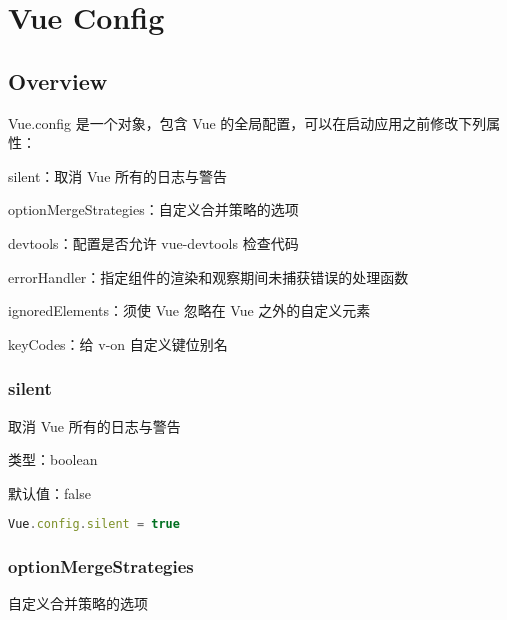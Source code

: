 \part{Vue Config}


\chapter{Overview}


Vue.config 是一个对象，包含 Vue 的全局配置，可以在启动应用之前修改下列属性：


\begin{compactitem}
\item silent：取消 Vue 所有的日志与警告
\item optionMergeStrategies：自定义合并策略的选项
\item devtools：配置是否允许 vue-devtools 检查代码
\item errorHandler：指定组件的渲染和观察期间未捕获错误的处理函数
\item ignoredElements：须使 Vue 忽略在 Vue 之外的自定义元素
\item keyCodes：给 v-on 自定义键位别名
\end{compactitem}


\section{silent}

取消 Vue 所有的日志与警告

\begin{compactitem}
\item 类型：boolean
\item 默认值：false
\end{compactitem}




\begin{lstlisting}[language=JavaScript]
Vue.config.silent = true
\end{lstlisting}


\section{optionMergeStrategies}

自定义合并策略的选项

\begin{compactitem}
\item 类型：\texttt{\{ [key: string]: Function \}}
\item 默认值：\texttt{\{\}\}
\end{compactitem}

